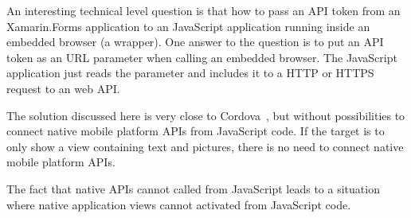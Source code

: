 \documentclass[conference]{IEEEtran}
\begin{document}
An interesting technical level question is that how to pass an API token from an Xamarin.Forms application to an JavaScript application running inside an embedded browser (a wrapper). One answer to the question is to put an API token as an URL parameter when calling an embedded browser. The JavaScript application just reads the parameter and includes it to a HTTP or HTTPS request to an web API.

The solution discussed here is very close to Cordova~\cite{cordova}, but without possibilities to connect native mobile platform APIs from JavaScript code. If the target is to only show a view containing text and pictures, there is no need to connect native mobile platform APIs.

The fact that native APIs cannot called from JavaScript leads to a situation where native application views cannot activated from JavaScript code. 

\nocite{xamarin}
\nocite{xamarin2}
\nocite{xamarin3}


\end{document}
